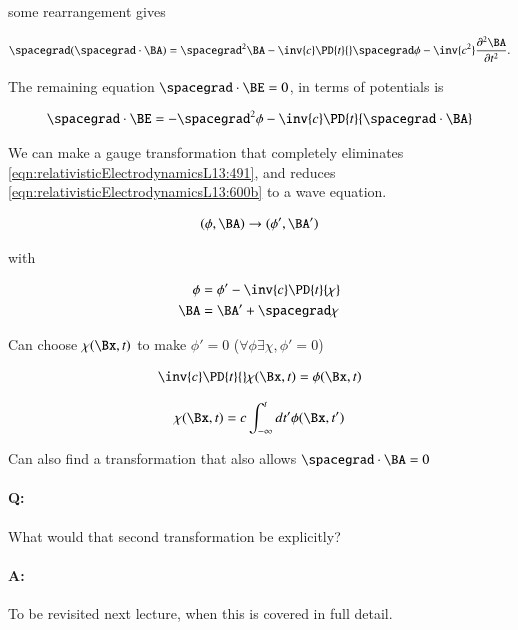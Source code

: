 some rearrangement gives

\begin{equation}\label{eqn:relativisticElectrodynamicsL13:600b}
\spacegrad (\spacegrad \cdot \BA) = \spacegrad^2 \BA  -\inv{c} \PD{t}{} \spacegrad \phi - \inv{c^2} \frac{\partial^2 \BA}{\partial t^2}.
\end{equation}

The remaining equation $\spacegrad \cdot \BE = 0$, in terms of potentials is

\begin{align}\label{eqn:relativisticElectrodynamicsL13:491}
\spacegrad \cdot \BE = - \spacegrad^2 \phi - \inv{c} \PD{t}{\spacegrad \cdot \BA} 
\end{align}

We can make a gauge transformation that completely eliminates \ref{eqn:relativisticElectrodynamicsL13:491}, and reduces \ref{eqn:relativisticElectrodynamicsL13:600b} to a wave equation.

\begin{align}\label{eqn:relativisticElectrodynamicsL13:490}
(\phi, \BA) \rightarrow (\phi', \BA')
\end{align}

with

\begin{align}\label{eqn:relativisticElectrodynamicsL13:510}
\phi &= \phi' - \inv{c} \PD{t}{\chi} \\
\BA &= \BA' + \spacegrad \chi
\end{align}

Can choose $\chi(\Bx, t)$ to make $\phi' = 0$ ($\forall \phi \exists \chi, \phi' = 0$)

\begin{align}\label{eqn:relativisticElectrodynamicsL13:530}
\inv{c} \PD{t}{} \chi(\Bx, t) = \phi(\Bx, t)
\end{align}

\begin{align}\label{eqn:relativisticElectrodynamicsL13:550}
\chi(\Bx, t) = c \int_{-\infty}^t dt' \phi(\Bx, t')
\end{align}

Can also find a transformation that also allows $\spacegrad \cdot \BA = 0$

\paragraph{Q:} What would that second transformation be explicitly? 
\paragraph{A:} To be revisited next lecture, when this is covered in full detail.

